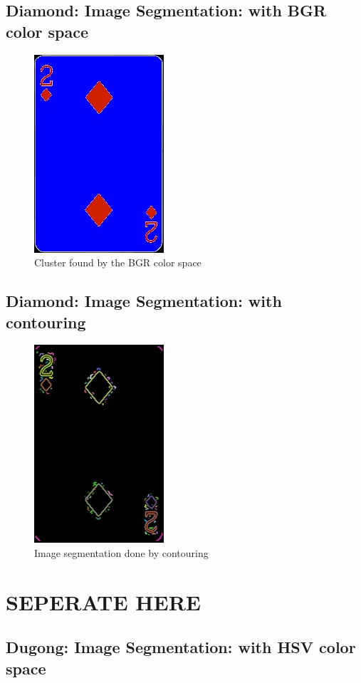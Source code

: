 \documentclass[conference]{IEEEtran}
\begin{document}
\subsection{Diamond: Image Segmentation: with BGR color space}
\begin{figure}[htp]
\includegraphics[width=0.2\linewidth]{../programme/results/Task_4/diamond/BGR/image_2.jpg}
\centering
\caption{Cluster found by the BGR color space}
\label{Cluster found by the BGR color space}
\end{figure}

\subsection{Diamond: Image Segmentation: with contouring}
\begin{figure}[htp]
\includegraphics[width=0.2\linewidth]{../programme/results/Task_4/diamond/contours/image_0.jpg}
\centering
\caption{Image segmentation done by contouring}
\label{Image segmentation done by contouring}
\end{figure}

\section{SEPERATE HERE}

\subsection{Dugong: Image Segmentation: with HSV color space}
\end{document}
